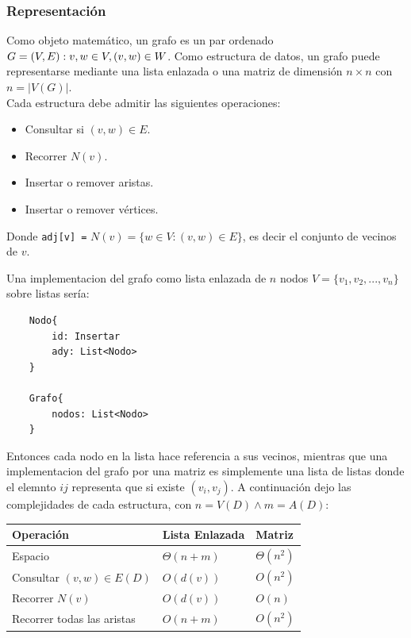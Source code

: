 \documentclass[12pt]{article}
\theoremstyle{definition}
\begin{document}
\subsubsection{Representación}
Como objeto matemático, un grafo es un par ordenado $G = (V, E) : v,w \in V, \\ (v,w) \in W$. Como estructura
de datos, un grafo puede representarse mediante una lista enlazada o una matriz de dimensión $n\times n$ con
$n = |V(G)|$. \\
Cada estructura debe admitir las siguientes operaciones:
\begin{itemize}
    \item Consultar si $(v,w) \in E$.
    \item Recorrer $N(v)$.
    \item Insertar o remover aristas.
    \item Insertar o remover vértices.
\end{itemize}

Donde \lstinline|adj[v] =| $N(v) = \{ w \in V: (v,w) \in E \}$, es decir el conjunto de vecinos de $v$.

Una implementacion del grafo como lista enlazada de $n$ nodos $V = \{v_1, v_2, ... , v_n \}$ sobre listas 
sería:
\begin{lstlisting}
    Nodo{
        id: Insertar
        ady: List<Nodo>
    }

    Grafo{
        nodos: List<Nodo>
    }
\end{lstlisting}

Entonces cada nodo en la lista hace referencia a sus vecinos, mientras que una implementacion del grafo por
una matriz es simplemente una lista de listas donde el elemnto $ij$ representa que si existe $(v_i, v_j )$.
A continuación dejo las complejidades de cada estructura, con $n=V(D) \land m=A(D)$:

\begin{table}[h!]
    \begin{center}
        \begin{tabular}{l l l }
            Operación   & Lista Enlazada  & Matriz \\ \hline
            Espacio     & $\Theta(n + m)$ & $\Theta(n^2)$ \\
            Consultar $(v,w) \in E(D)$ & $O(d(v))$ & $O(n^2)$ \\
            Recorrer $N(v)$ & $O(d(v))$ & $O(n)$ \\
            Recorrer todas las aristas & $O(n + m)$ & $O(n^2)$ \\ \hline
        \end{tabular}
    \end{center}
\end{table}
\end{document}
